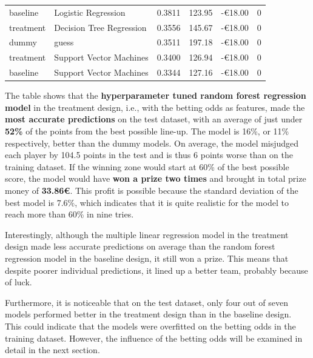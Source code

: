 \begin{table}[H]
{\begin{tabular}{@{}llccrc@{}}
    baseline    & Logistic Regression               & 0.3811 & 123.95 & -€18.00    & 0 \\
    treatment   & Decision Tree Regression          & 0.3556 & 145.67 & -€18.00    & 0 \\
    dummy       & guess                             & 0.3511 & 197.18 & -€18.00    & 0 \\
    treatment   & Support Vector Machines           & 0.3400 & 126.94 & -€18.00    & 0 \\
    baseline    & Support Vector Machines           & 0.3344 & 127.16 & -€18.00    & 0 \\\bottomrule
    \end{tabular}
    }
\end{table}

The table shows that the \textbf{hyperparameter tuned random forest regression model} in the treatment design, i.e., with the betting odds as features, made the \textbf{most accurate predictions} on the test dataset, with an average of just under \textbf{52\%} of the points from the best possible line-up. The model is 16\%, or 11\% respectively, better than the dummy models. On average, the model misjudged each player by 104.5 points in the test and is thus 6 points worse than on the training dataset. If the winning zone would start at 60\% of the best possible score, the model would have \textbf{won a prize two times} and brought in total prize money of \textbf{33.86€}. This profit is possible because the standard deviation of the best model is 7.6\%, which indicates that it is quite realistic for the model to reach more than 60\% in nine tries.

\clearpage Interestingly, although the multiple linear regression model in the treatment design made less accurate predictions on average than the random forest regression model in the baseline design, it still won a prize. This means that despite poorer individual predictions, it lined up a better team, probably because of luck.

Furthermore, it is noticeable that on the test dataset, only four out of seven models performed better in the treatment design than in the baseline design. This could indicate that the models were overfitted on the betting odds in the training dataset. However, the influence of the betting odds will be examined in detail in the next section.







